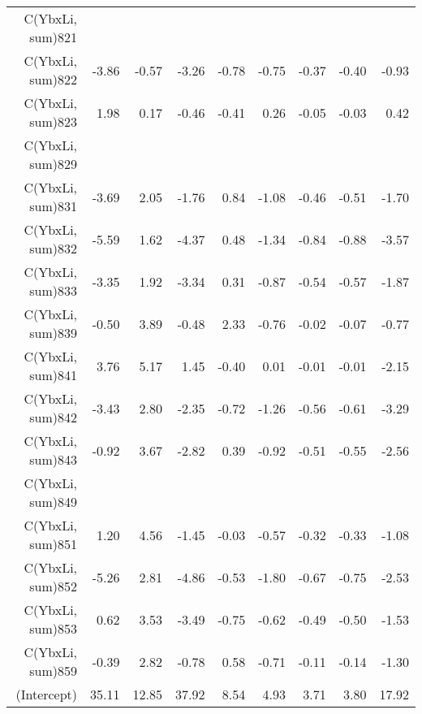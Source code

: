 \begin{table}[p]
\begin{tabular}{rrrrrrrrr}
  C(YbxLi, sum)821 &  &  &  &  &  &  &  &  \\ 
  C(YbxLi, sum)822 & -3.86 & -0.57 & -3.26 & -0.78 & -0.75 & -0.37 & -0.40 & -0.93 \\ 
  C(YbxLi, sum)823 & 1.98 & 0.17 & -0.46 & -0.41 & 0.26 & -0.05 & -0.03 & 0.42 \\ 
  C(YbxLi, sum)829 &  &  &  &  &  &  &  &  \\ 
  C(YbxLi, sum)831 & -3.69 & 2.05 & -1.76 & 0.84 & -1.08 & -0.46 & -0.51 & -1.70 \\ 
  C(YbxLi, sum)832 & -5.59 & 1.62 & -4.37 & 0.48 & -1.34 & -0.84 & -0.88 & -3.57 \\ 
  C(YbxLi, sum)833 & -3.35 & 1.92 & -3.34 & 0.31 & -0.87 & -0.54 & -0.57 & -1.87 \\ 
  C(YbxLi, sum)839 & -0.50 & 3.89 & -0.48 & 2.33 & -0.76 & -0.02 & -0.07 & -0.77 \\ 
  C(YbxLi, sum)841 & 3.76 & 5.17 & 1.45 & -0.40 & 0.01 & -0.01 & -0.01 & -2.15 \\ 
  C(YbxLi, sum)842 & -3.43 & 2.80 & -2.35 & -0.72 & -1.26 & -0.56 & -0.61 & -3.29 \\ 
  C(YbxLi, sum)843 & -0.92 & 3.67 & -2.82 & 0.39 & -0.92 & -0.51 & -0.55 & -2.56 \\ 
  C(YbxLi, sum)849 &  &  &  &  &  &  &  &  \\ 
  C(YbxLi, sum)851 & 1.20 & 4.56 & -1.45 & -0.03 & -0.57 & -0.32 & -0.33 & -1.08 \\ 
  C(YbxLi, sum)852 & -5.26 & 2.81 & -4.86 & -0.53 & -1.80 & -0.67 & -0.75 & -2.53 \\ 
  C(YbxLi, sum)853 & 0.62 & 3.53 & -3.49 & -0.75 & -0.62 & -0.49 & -0.50 & -1.53 \\ 
  C(YbxLi, sum)859 & -0.39 & 2.82 & -0.78 & 0.58 & -0.71 & -0.11 & -0.14 & -1.30 \\ 
  (Intercept) & 35.11 & 12.85 & 37.92 & 8.54 & 4.93 & 3.71 & 3.80 & 17.92 \\ 
   \hline
\end{tabular}
\end{table}
